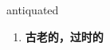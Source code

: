 
\begin{frame}
{\huge antiquated}
\begin{center}
\begin{enumerate}\Large
  \item \textbf{古老的，过时的}
\end{enumerate}
\end{center}
\end{frame}
